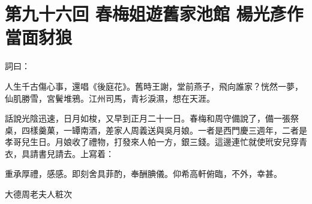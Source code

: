 
\chapter*{第九十六回 春梅姐遊舊家池館 楊光彥作當面豺狼}


詞曰：

\begin{myquote}
人生千古傷心事，還唱《後庭花》。舊時王謝，堂前燕子，飛向誰家？恍然一夢，仙肌勝雪，宮鬢堆鴉。江州司馬，青衫淚濕，想在天涯。

\end{myquote}

話說光陰迅速，日月如梭，又早到正月二十一日。春梅和周守備說了，備一張祭桌，四樣羹菓，一罈南酒，差家人周義送與吳月娘。一者是西門慶三週年，二者是孝哥兒生日。月娘收了禮物，打發來人帕一方，銀三錢。這邊連忙就使玳安兒穿青衣，具請書兒請去。上寫着：

\begin{myquote}[\markfont]
重承厚禮，感感。即刻舍具菲酌，奉酬腆儀。仰希高軒俯臨，不外，幸甚。


大德周老夫人粧次
\end{myquote}

